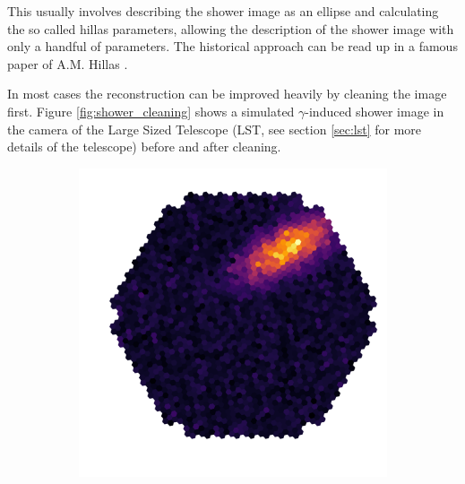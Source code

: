 This usually involves describing the 
shower image as an ellipse and calculating the so called hillas parameters,
allowing the description of the shower image with only a handful of parameters.
The historical approach can be read up in 
a famous paper of A.M. Hillas \cite{hillas_params}.

In most cases the reconstruction can be improved heavily by cleaning the image first.
Figure \ref{fig:shower_cleaning} shows a simulated $\gamma$-induced shower image
in the camera of the Large Sized Telescope (LST, see section \ref{sec:lst} for more details of the telescope)
before and after cleaning.

\begin{figure}
	\centering
	\begin{subfigure}{.45\textwidth}
  		\centering
  		\includegraphics[width=\linewidth]{Plots/hillas_raw.pdf}
	\end{subfigure}%
	\begin{subfigure}{.45\textwidth}
 		\centering

\end{subfigure}
\end{figure}
